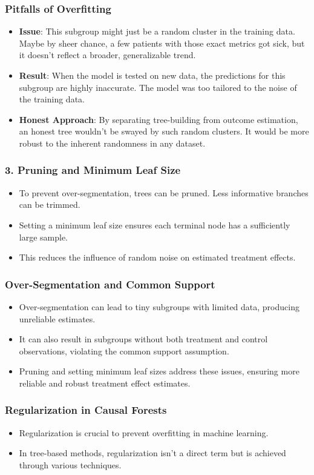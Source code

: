 \documentclass{beamer}
\begin{document}
\begin{frame}
\frametitle{Pitfalls of Overfitting}
\begin{itemize}
\item \textbf{Issue}: This subgroup might just be a random cluster in the training data. Maybe by sheer chance, a few patients with those exact metrics got sick, but it doesn't reflect a broader, generalizable trend.
\item \textbf{Result}: When the model is tested on new data, the predictions for this subgroup are highly inaccurate. The model was too tailored to the noise of the training data.
\item \textbf{Honest Approach}: By separating tree-building from outcome estimation, an honest tree wouldn't be swayed by such random clusters. It would be more robust to the inherent randomness in any dataset.
\end{itemize}
\end{frame}



\begin{frame}
\frametitle{3. Pruning and Minimum Leaf Size}
\begin{itemize}
\item To prevent over-segmentation, trees can be pruned. Less informative branches can be trimmed.
\item Setting a minimum leaf size ensures each terminal node has a sufficiently large sample.
\item This reduces the influence of random noise on estimated treatment effects.
\end{itemize}
\end{frame}

\begin{frame}
\frametitle{Over-Segmentation and Common Support}
\begin{itemize}
\item Over-segmentation can lead to tiny subgroups with limited data, producing unreliable estimates.
\item It can also result in subgroups without both treatment and control observations, violating the common support assumption.
\item Pruning and setting minimum leaf sizes address these issues, ensuring more reliable and robust treatment effect estimates.
\end{itemize}
\end{frame}


\begin{frame}
\frametitle{Regularization in Causal Forests}
\begin{itemize}
\item Regularization is crucial to prevent overfitting in machine learning.
\item In tree-based methods, regularization isn't a direct term but is achieved through various techniques.
\end{itemize}
\end{frame}
\end{document}
